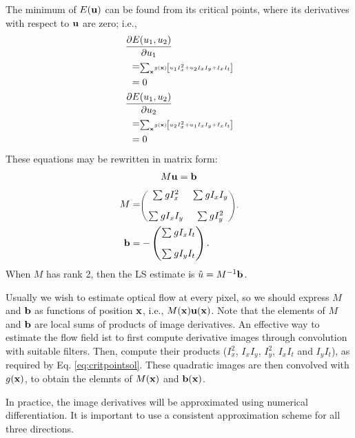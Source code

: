 \begin{compactdesc}
	The minimum of $E(\bm{\mathrm{u}})$ can be found from its critical points, where its derivatives with respect to $\bm{\mathrm{u}}$ are zero; i.e.,
	\begin{align*}\scriptscriptstyle
		&\frac{\partial E(u_1,u_2)}{\partial u_1}\\
		&\;\,=\scriptscriptstyle\sum_{\bm{\mathrm{x}}}^{}\!g(\bm{\mathrm{x}})\left[ u_1I_{x}^{2}+u_2I_xI_y+I_xI_t \right]\\
		&\;\,=0\\
		&\frac{\partial E(u_1,u_2)}{\partial u_2}\\
		&\;\,=\scriptscriptstyle\sum_{\bm{\mathrm{x}}}^{}\!g(\bm{\mathrm{x}})\left[ u_2I_{x}^{2}+u_1I_xI_y+I_xI_t \right]\\
		&\;\,=0
	\end{align*}
	These equations may be rewritten in matrix form:
	\begin{gather}
		M\bm{\mathrm{u}}=\bm{\mathrm{b}}
		\label{eq:critpointsol}
	\end{gather}
	\begin{align*}
		M&=\scriptscriptstyle
		\begin{pmatrix}
			\sum_{}^{}gI_{x}^{2}&\sum_{}^{}gI_xI_y\\[1em]
			\sum_{}^{}gI_xI_y&\sum_{}^{}gI_{y}^{2}
		\end{pmatrix},\\
		\bm{\mathrm{b}}&=-
		\begin{pmatrix}
			\sum_{}^{}gI_xI_t\\[1em]
			\sum_{}^{}gI_yI_t
		\end{pmatrix}.
	\end{align*}
	When $M$ has rank 2, then the LS estimate is $\hat{u}=M^{-1}\bm{\mathrm{b}}$.
\item[\lp{Implementation Issues}] Usually we wish to estimate optical flow at every pixel, so we should express $M$ and $\bm{\mathrm{b}}$ as functions of position $\bm{\mathrm{x}}$, i.e., $M(\bm{\mathrm{x}})\bm{\mathrm{u}}(\bm{\mathrm{x}})$. Note that the elements of $M$ and $\bm{\mathrm{b}}$ are local sums of products of image derivatives. An effective way to estimate the flow field ist to first compute derivative images through convolution with suitable filters. Then, compute their products ($I_{x}^{2}$, $I_xI_y$, $I_y^2$, $I_xI_t$ and $I_yI_t$), as required by Eq. \ref{eq:critpointsol}. These quadratic images are then convolved with $g(\bm{\mathrm{x}})$, to obtain the elemnts of $M(\bm{\mathrm{x}})$ and $\bm{\mathrm{b}}(\bm{\mathrm{x}})$.

	In practice, the image derivatives will be approximated using numerical differentiation. It is important to use a consistent approximation scheme for all three directions.

\end{compactdesc}
